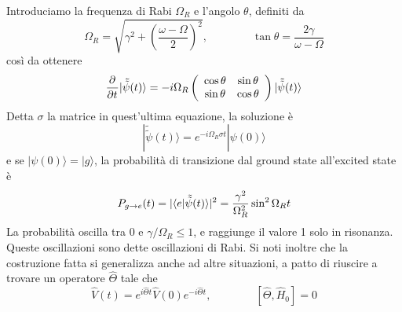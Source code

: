 \documentclass[a4paper, 11pt]{article}
\newcommand{\op}[1]{\hat{#1}}
\renewcommand{\op}[1]{\hat{#1}}
\newcommand{\ham}{\hat{H}}
\renewcommand{\ket}[1]{| #1\rangle}
\begin{document}
Introduciamo la frequenza di Rabi $\Omega_R$ e l'angolo $\theta$, definiti da
\[\Omega_R=\sqrt{\gamma^2+\left(\frac{\omega-\Omega}{2}\right)^2},\qquad\qquad\tan\theta=\frac{2\gamma}{\omega-\Omega}\]
così da ottenere
\[\pder{}{t}\ket{\tilde{\tilde{\psi}}(t)}=-i\Omega_R\left(\begin{array}{c c}
\cos\theta&\sin\theta\\\sin\theta&\cos\theta
\end{array}\right)\ket{\tilde{\tilde{\psi}}(t)}\]
Detta $\sigma$ la matrice in quest'ultima equazione, la soluzione è
\[\ket{\tilde{\tilde{\psi}}(t)}=e^{-i\Omega_R\sigma t}\ket{\psi(0)}\]
e se $\ket{\psi(0)}=\ket g$, la probabilità di transizione dal ground state all'excited state è
\[P_{g\to e}(t)=|\langle e\vert\tilde{\tilde{\psi}}(t)\rangle|^2=\frac{\gamma^2}{\Omega_R^2}\sin^2\Omega_Rt\]
La probabilità oscilla tra $0$ e $\gamma/\Omega_R\leq1$, e raggiunge il valore 1 solo in risonanza. Queste oscillazioni sono dette oscillazioni di Rabi. Si noti inoltre che la costruzione fatta si generalizza anche ad altre situazioni, a patto di riuscire a trovare un operatore $\op{\Theta}$ tale che
\[\op V(t)=e^{i\op \Theta t}\op V(0)e^{-i\op \Theta t},\qquad\qquad[\op \Theta,\ham_0]=0\]
\end{document}
